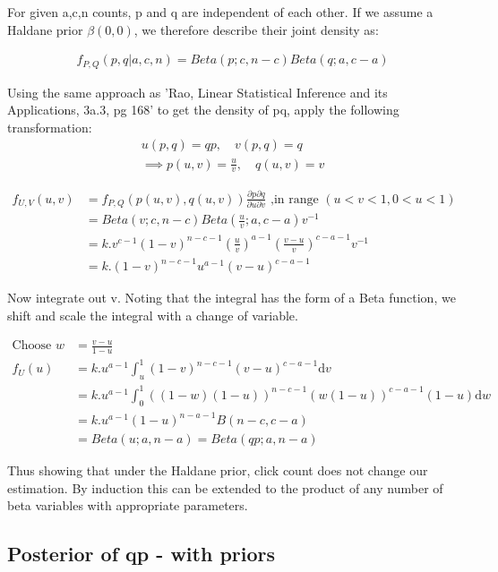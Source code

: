 \documentclass[11pt,a4,singlespacing,titlepagenumber=on]{scrreprt}
\numberwithin{equation}{chapter} %
\theoremstyle{remark}
\begin{document}
For given a,c,n counts, p and q are independent of each other. If we assume a Haldane prior $\beta(0,0)$, we therefore describe their joint density as:

\begin{align}
 f_{P,Q}(p,q|a,c,n) = Beta(p;c,n-c) Beta(q;a,c-a)
\end{align}

Using the same approach as 'Rao, Linear Statistical Inference and its Applications, 3a.3, pg 168' to get the density of pq, apply the following transformation:
\begin{align}
 u(p,q) = qp, \quad v(p,q) = q  \\
 \implies p(u,v) = \frac{u}{v}, \quad q(u,v) = v
\end{align}

\begin{align}
 f_{U,V}(u,v) &= f_{P,Q}(p(u,v),q(u,v)) 
		\frac{\partial p \partial q}{\partial u \partial v} 
		\text{ ,in range }  (u<v<1,0<u<1) \\
 &= Beta(v;c,n-c) Beta(\frac{u}{v};a,c-a) v^{-1} \\
 &= k . v^{c-1} (1-v)^{n-c-1} (\frac{u}{v})^{a-1} (\frac{v - u}{v})^{c-a-1} v^{-1} \\
 &= k . (1-v)^{n-c-1} u^{a-1} (v - u)^{c-a-1}
\end{align}

Now integrate out v. Noting that the integral has the form of a Beta function, we shift and scale the integral with a change of variable.

\begin{align}
\text{Choose }  w &= \frac{v-u}{1-u} \\
f_U(u) &= k.u^{a-1} \int_u^1 (1-v)^{n-c-1} (v - u)^{c-a-1} \mathrm{d}v \\
 &= k.u^{a-1} \int_0^1 ((1-w)(1-u))^{n-c-1} (w(1-u))^{c-a-1} (1-u) \mathrm{d}w \\
 &= k.u^{a-1} (1-u)^{n-a-1} B(n-c,c-a) \\
 &= Beta(u;a,n-a) = Beta(qp;a,n-a) 
\end{align}

Thus showing that under the Haldane prior, click count does not change our estimation. By induction this can be extended to the product of any number of beta variables with appropriate parameters.

\subsection{Posterior of qp - with priors}
\end{document}
